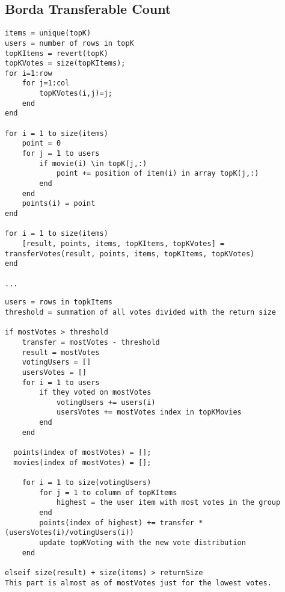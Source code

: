 \subsection{Borda Transferable Count} \label{sec:BTC}
\begin{lstlisting}[caption={Borda transferable count implementation},label=lst:BTC]
items = unique(topK)
users = number of rows in topK
topKItems = revert(topK)
topKVotes = size(topKItems);
for i=1:row
    for j=1:col
        topKVotes(i,j)=j;
    end 
end

for i = 1 to size(items)
	point = 0
	for j = 1 to users
		if movie(i) \in topK(j,:)
			point += position of item(i) in array topK(j,:)
		end
	end
	points(i) = point
end

for i = 1 to size(items)
	[result, points, items, topKItems, topKVotes] = transferVotes(result, points, items, topKItems, topKVotes)
end
	
...
\end{lstlisting}

\begin{lstlisting}[caption={Implementation for the transfer method},label=lst:BTCtransfer]
users = rows in topkItems
threshold = summation of all votes divided with the return size

if mostVotes > threshold
	transfer = mostVotes - threshold
	result = mostVotes
	votingUsers = []
	usersVotes = []
	for i = 1 to users 
		if they voted on mostVotes
			votingUsers += users(i)
			usersVotes += mostVotes index in topKMovies
		end
	end
	
  points(index of mostVotes) = [];
  movies(index of mostVotes) = [];
	
	for i = 1 to size(votingUsers)
		for j = 1 to column of topKItems
			highest = the user item with most votes in the group
		end
		points(index of highest) += transfer * (usersVotes(i)/votingUsers(i))
		update topKVoting with the new vote distribution 
	end
	
elseif size(result) + size(items) > returnSize
This part is almost as of mostVotes just for the lowest votes.

\end{lstlisting}